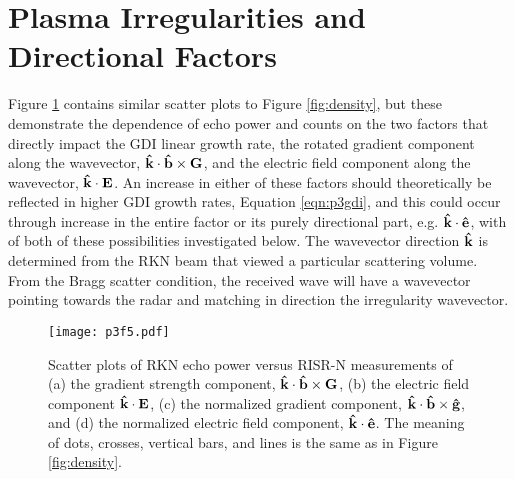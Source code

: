 \section{Plasma Irregularities and Directional Factors}
Figure \ref{fig:directional} contains similar scatter plots to Figure \ref{fig:density}, but these demonstrate the dependence of echo power and counts on the two factors that directly impact the GDI linear growth rate, the rotated gradient component along the wavevector, \(\mathbf{\hat{k}}\cdot\mathbf{\hat{b}}\times\mathbf{G}\), and the electric field component along the wavevector, \(\mathbf{\hat{k}}\cdot\mathbf{E}\). An increase in either of these factors should theoretically be reflected in higher GDI growth rates, Equation \ref{eqn:p3gdi}, and this could occur through increase in the entire factor or its purely directional part, e.g. \(\mathbf{\hat{k}}\cdot\mathbf{\hat{e}}\), with of both of these possibilities investigated below. The wavevector direction \(\mathbf{\hat{k}}\) is determined from the RKN beam that viewed a particular scattering volume.  From the Bragg scatter condition, the received wave will have a wavevector pointing towards the radar and matching in direction the irregularity wavevector.

\begin{figure}
	\texttt{[image: p3f5.pdf]}
  \caption[Irregularity Dependence on Directional Factors]{Scatter plots of RKN echo power versus RISR-N measurements of (a) the gradient strength component, \(\mathbf{\hat{k}}\cdot\mathbf{\hat{b}}\times\mathbf{G}\), (b) the electric field component \(\mathbf{\hat{k}}\cdot\mathbf{E}\), (c) the normalized gradient component, \(\mathbf{\hat{k}}\cdot\mathbf{\hat{b}}\times\mathbf{\hat{g}}\), and (d) the normalized electric field component, \(\mathbf{\hat{k}}\cdot\mathbf{\hat{e}}\). The meaning of dots, crosses, vertical bars, and lines is the same as in Figure \ref{fig:density}.}
  \label{fig:directional}
\end{figure}

